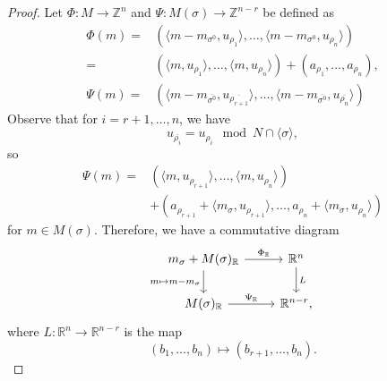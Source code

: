 \begin{proof}
    Let $\Phi\colon M\rightarrow \mathbb{Z}^n$ and $\Psi\colon M(\sigma)\rightarrow \mathbb{Z}^{n-r}$ be defined as
    \[
    \begin{aligned}
    \Phi(m)=&\left( \langle m-m_{\sigma^0},u_{\rho_1} \rangle,\dots,\langle m-m_{\sigma^0},u_{\rho_n} \rangle \right)\\
    =& \left( \langle m,u_{\rho_1}\rangle,\dots,\langle m,u_{\rho_n}\rangle \right) + (a_{\rho_1},\ldots,a_{\rho_n}),\\
    \Psi(m)=&\left( \langle m-m_{\overline{\sigma^0}},u_{\overline{\rho_{r+1}}} \rangle,\dots,\langle m-m_{\overline{\sigma^0}},u_{\overline{\rho_n}} \rangle \right)
    \end{aligned}
    \]
    Observe that for $i=r+1,\ldots,n$, we have
    \[
        u_{\overline{\rho_i}}=u_{\rho_i}\mod N\cap \langle \sigma \rangle,
    \]
    so
    \[
    \begin{aligned}
    \Psi(m)=&\left( \langle m,u_{\rho_{r+1}}  \rangle,\ldots, \langle m,u_{\rho_{n}}  \rangle\right)\\
    &+\left(a_{\rho_{r+1}}+\langle m_{\sigma},u_{\rho_{r+1}}\rangle,\ldots,a_{\rho_n}+\langle m_{\sigma},u_{\rho_n}\rangle\right)
    \end{aligned}
    \]
    for $m\in M(\sigma)$. Therefore, we have a commutative diagram
    \[
    \begin{tikzcd}
	m_{\sigma}+M(\sigma)_{\mathbb{R}} \arrow[r, "\Phi_{\mathbb{R}}"] \arrow[d, "{m\mapsto m-m_{\sigma}}"']                         & \mathbb{R}^n \arrow[d, "L"] \\
	M(\sigma)_{\mathbb{R}} \arrow[r, "\Psi_{\mathbb{R}}"] & \mathbb{R}^{n-r},
	\end{tikzcd}
    \]
    where $L\colon \mathbb{R}^n\rightarrow \mathbb{R}^{n-r}$ is the map
    \[
    (b_1,\ldots,b_n)\mapsto (b_{r+1},\ldots,b_{n}).
    \]


\end{proof}
